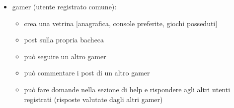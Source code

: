 \documentclass{article}
\begin{document}
\begin{itemize}
    \item gamer (utente registrato comune):
    \begin{itemize}
      \item crea una vetrina [anagrafica, console preferite, giochi posseduti]
      \item post sulla propria bacheca
      \item può seguire un altro gamer
      \item può commentare i post di un altro gamer
      \item può fare domande nella sezione di help e rispondere agli altri utenti registrati (risposte valutate dagli altri gamer)
    \end{itemize}


\end{itemize}
\end{document}
